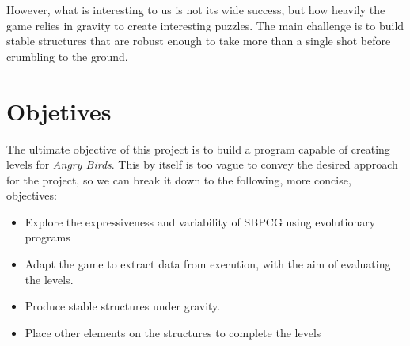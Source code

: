 However, what is interesting to us is not its wide success, but how heavily the game relies in gravity to create interesting puzzles. The main challenge is to build stable structures that are robust enough to take more than a single shot before crumbling to the ground.

\section{Objetives}

The ultimate objective of this project is to build a program capable of creating levels for \textit{Angry Birds}. This by itself is too vague to convey the desired approach for the project, so we can break it down to the following, more concise, objectives:

\begin{itemize}
	\item Explore the expressiveness and variability of \ac{SBPCG} using evolutionary programs
	\item Adapt the game to extract data from execution, with the aim of evaluating the levels.
	\item Produce stable structures under gravity.
	\item Place other elements on the structures to complete the levels
\end{itemize} 

